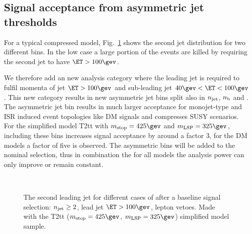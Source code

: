 \subsection{Signal acceptance from asymmetric jet \Pt thresholds}

For a typical compressed model, Fig.~\ref{fig:asymMotivation} shows the second jet \PT
distribution for two different \HT bins. In the low \HT case a large portion of
the events are killed by requiring the second jet to have $\ET>100\gev$. 

We therefore add an new analysis category where the leading jet is required to fulfil 
momenta of jet $\ET>100\gev$ and sub-leading jet $40\gev<\ET<100\gev$. This new category 
results in new asymmetric jet bins split also in $\njet$, $\nb$ and \HT. The asymmetric jet bin
results in much larger acceptance for monojet-type and ISR induced event topologies like DM signals
and compresses SUSY scenarios. 
For the simplified model T2tt with $m_{\rm stop}=425\gev$ and $m_{\rm LSP}=325\gev$, 
including these bins increases signal acceptance by around a factor 3, for the DM models a factor of five is observed.
The asymmetric bins will be added to the nominal selection, thus in combination the for all models the analysis power can only improve or remain constant.
\begin{figure}[h!]
  \centering
  ~~
  \\
  \caption{\label{fig:asymMotivation} The second leading jet \PT for different
  cases of \HT after a baseline signal selection: $\njet\geq2$, lead jet
  $\ET>100\gev$, lepton vetoes. Made with the T2tt ($m_{\rm
    stop}=425\gev$, $m_{\rm LSP}=325\gev$) simplified model sample.}
\end{figure}

